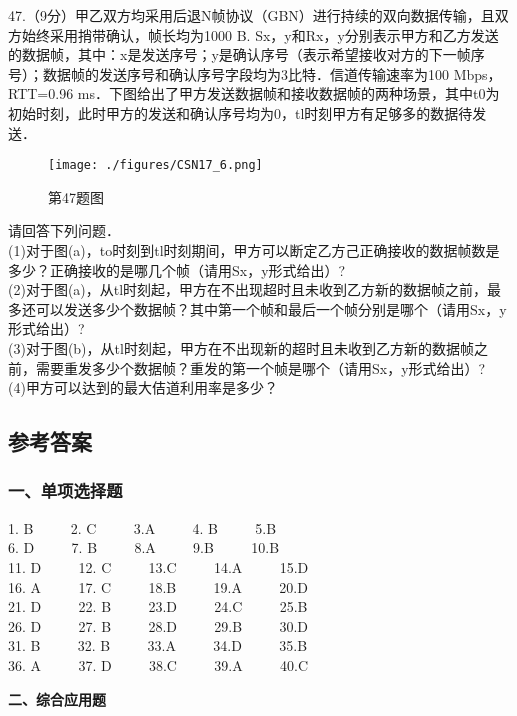 47.（9分）甲乙双方均采用后退N帧协议（GBN）进行持续的双向数据传输，且双方始终采用捎带确认，帧长均为1000 B. Sx，y和Rx，y分别表示甲方和乙方发送的数据帧，其中：x是发送序号；y是确认序号（表示希望接收对方的下一帧序号）；数据帧的发送序号和确认序号字段均为3比特．信道传输速率为100 Mbps，RTT=0.96 ms．下图给出了甲方发送数据帧和接收数据帧的两种场景，其中t0为初始时刻，此时甲方的发送和确认序号均为0，tl时刻甲方有足够多的数据待发送．
\begin{figure}[ht]
\centering
\texttt{[image: ./figures/CSN17\_6.png]}
\caption{第47题图} \label{CSN17_fig6}
\end{figure}
请回答下列问题．  \\
(1)对于图(a)，to时刻到tl时刻期间，甲方可以断定乙方己正确接收的数据帧数是多少？正确接收的是哪几个帧（请用Sx，y形式给出）? \\
(2)对于图(a)，从tl时刻起，甲方在不出现超时且未收到乙方新的数据帧之前，最多还可以发送多少个数据帧？其中第一个帧和最后一个帧分别是哪个（请用Sx，y形式给出）? \\
(3)对于图(b)，从tl时刻起，甲方在不出现新的超时且未收到乙方新的数据帧之前，需要重发多少个数据帧？重发的第一个帧是哪个（请用Sx，y形式给出）? \\
(4)甲方可以达到的最大佶道利用率是多少？


\subsection{参考答案}
\subsubsection{一、单项选择题}

1. B  $\qquad$ 2. C $\qquad$ 3.A $\qquad$ 4. B $\qquad$ 5.B \\
6. D $\qquad$ 7. B $\qquad$ 8.A $\qquad$ 9.B $\qquad$ 10.B \\
11. D $\qquad$ 12. C $\qquad$ 13.C $\qquad$ 14.A $\qquad$ 15.D \\
16. A $\qquad$ 17. C $\qquad$ 18.B $\qquad$ 19.A $\qquad$ 20.D \\
21. D $\qquad$ 22. B $\qquad$ 23.D $\qquad$ 24.C $\qquad$ 25.B \\
26. D $\qquad$ 27. B $\qquad$ 28.D $\qquad$ 29.B $\qquad$ 30.D \\
31. B $\qquad$ 32. B $\qquad$ 33.A $\qquad$ 34.D $\qquad$ 35.B \\
36. A $\qquad$ 37. D $\qquad$ 38.C $\qquad$ 39.A $\qquad$ 40.C

  \textbf{二、综合应用题}

